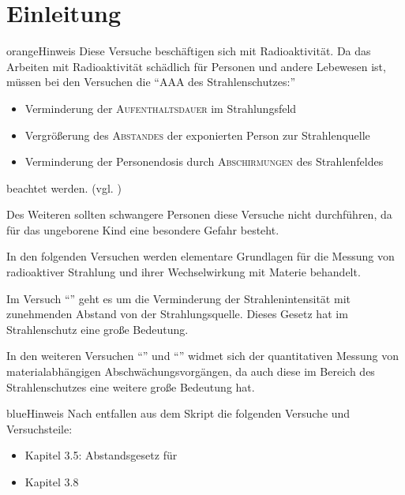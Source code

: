 \documentclass[../protokoll.tex]{subfiles}
\begin{document}
\part{Einleitung}
\begin{messageBox}{orange}{Hinweis}
Diese Versuche beschäftigen sich mit Radioaktivität. Da das Arbeiten mit
Radioaktivität schädlich für Personen und andere Lebewesen ist, müssen bei den
Versuchen die "`AAA des Strahlenschutzes:"'
\begin{itemize}
    \item Verminderung der \textsc{Aufenthaltsdauer} im Strahlungsfeld
    \item Vergrößerung des \textsc{Abstandes} der exponierten Person zur Strahlenquelle
    \item Verminderung der Personendosis durch \textsc{Abschirmungen} des Strahlenfeldes
\end{itemize}
beachtet werden. (vgl. \cite{AAA-Regel})

Des Weiteren sollten schwangere Personen diese Versuche nicht
durchführen, da für das ungeborene Kind eine besondere Gefahr besteht.
\end{messageBox}

In den folgenden Versuchen werden elementare Grundlagen für die Messung von
radioaktiver Strahlung und ihrer Wechselwirkung mit Materie behandelt.

Im Versuch "`"' geht es um die Verminderung der
Strahlenintensität mit zunehmenden Abstand von der Strahlungsquelle. Dieses
Gesetz hat im Strahlenschutz eine große Bedeutung.

In den weiteren Versuchen "`"' und
"`"' widmet sich der quantitativen
Messung von materialabhängigen Abschwächungsvorgängen, da auch diese im Bereich
des Strahlenschutzes eine weitere große Bedeutung hat.

\begin{messageBox}{blue}{Hinweis}
    Nach \cite{listeEntfallendeVersuche} entfallen aus dem Skript die folgenden
    Versuche und Versuchsteile:
    \begin{itemize}
        \item Kapitel 3.5: Abstandsgesetz für 
        \item Kapitel 3.8
    \end{itemize}
\end{messageBox}
\end{document}
